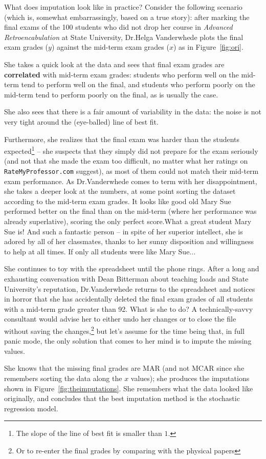 What does imputation look like in practice? \newl Consider the following scenario (which is, somewhat embarrassingly, based on a true story): after marking the final exams of the 100 students who did not drop her course in \textit{Advanced Retroencabulation} at State University, Dr.\@ Helga Vanderwhede plots the final exam grades ($y$) against the mid-term exam grades ($x$) as in Figure~\ref{fig:ori}. \par She takes a quick look at the data and sees that final exam grades are \textbf{correlated} with mid-term exam grades: students who perform well on the mid-term tend to perform well on the final, and students who perform poorly on the mid-term tend to perform poorly on the final, as is usually the case. \par She also sees that there is a fair amount of variability in the data: the noise is not very tight around the (eye-balled) line of best fit. \par Furthermore, she realizes that the final exam was harder than the students expected\footnote{The slope of the line of best fit is smaller than $1$.} -- she suspects that they simply did not prepare for the exam seriously (and not that she made the exam too difficult, no matter what her ratings on \texttt{RateMyProfessor.com} suggest), as most of them could not match their mid-term exam performance. 
\newl As Dr.\@ Vanderwhede comes to term with her disappointment, she takes a deeper look at the numbers, at some point sorting the dataset according to the mid-term exam grades. It looks like good old Mary Sue performed better on the final than on the mid-term (where her performance was already superlative), scoring the only perfect score.\newpage\noindent  What a great student Mary Sue is! And such a fantastic person -- in spite of her superior intellect, she is adored by all of her classmates, thanks to her sunny disposition and willingness to help at all times. If only all students were like Mary Sue... \par She continues to toy with the spreadsheet until the phone rings. After a long and exhausting conversation with Dean Bitterman about teaching loads and State University's reputation, Dr.\@ Vanderwhede returns to the spreadsheet and notices in horror that she has accidentally deleted the final exam grades of all students with a mid-term grade greater than 92. \newl What is she to do? \newl A technically-savvy consultant would advise her to either undo her changes or to close the file without saving the changes,\footnote{Or to re-enter the final grades by comparing with the physical papers} but let's assume for the time being that, in full panic mode, the only solution that comes to her mind is to impute the missing values. \par She knows that the missing final grades are MAR (and not MCAR since she remembers sorting the data along the $x$ values); she produces the imputations shown in Figure~\ref{fig:theimputations}. She remembers what the data looked like originally, and concludes that the best imputation method is the stochastic regression model.

